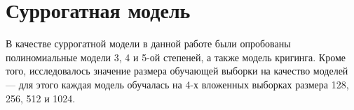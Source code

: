 \section{Суррогатная модель}
В качестве суррогатной модели в данной работе были опробованы полиномиальные модели 3, 4 и 5-ой степеней, а также модель кригинга. Кроме того, исследовалось значение размера обучающей выборки на качество моделей --- для этого каждая модель обучалась на 4-х вложенных выборках размера 128, 256, 512 и 1024.





